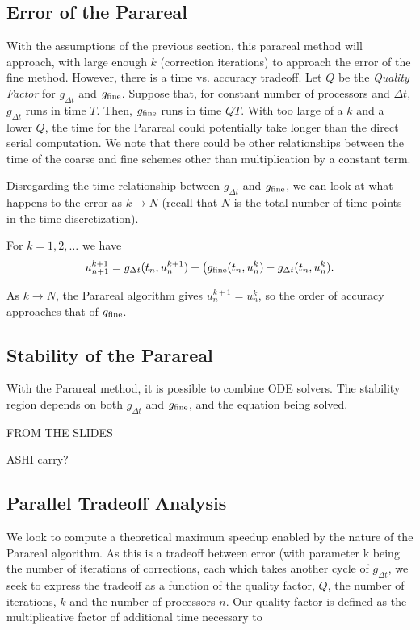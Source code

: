 \documentclass[letterpaper,12pt]{article}
\begin{document}
\subsection{Error of the Parareal}

With the assumptions of the previous section, this parareal method will
approach, with large enough $k$ (correction iterations) to approach the error of
the fine method. However, there is a time vs. accuracy tradeoff. Let $Q$ be the
\emph{Quality Factor} for $g_{\Delta t}$ and $g_{\textnormal{fine}}$. Suppose
that, for constant number of processors and $\Delta t$, $g_{\Delta t}$ runs in
time $T$. Then, $g_{\textnormal{fine}}$ runs in time $QT$. With too large of a
$k$ and a lower $Q$, the time for the Parareal could potentially take longer
than the direct serial computation. We note that there could be other
relationships between the time of the coarse and fine schemes other than
multiplication by a constant term. 

Disregarding the time relationship between $g_{\Delta t}$ and
$g_{\textnormal{fine}}$, we can look at what happens to the error as $k \to N$
(recall that $N$ is the total number of time points in the time discretization). 

For $k = 1, 2, \ldots$ we have 
\[u_{n+1}^{k+1} = g_{\Delta t} (t_n, u_n^{k+1}) + \big(
g_{\textnormal{fine}}(t_n, u_n^k) - g_{\Delta t}(t_n, u_n^k). \]

As $k \to N$, the Parareal algorithm gives $u_{n}^{k+1} = u^k_n$, so the order
of accuracy approaches that of $g_{\textnormal{fine}}$. 


\subsection{Stability of the Parareal}

With the Parareal method, it is possible to combine ODE solvers. The stability region depends on both $g_{\Delta t}$ and $g_{\textnormal{fine}}$, and the
equation being solved. 

FROM THE SLIDES 

ASHI carry?


\subsection{Parallel Tradeoff Analysis}

We look to compute a theoretical maximum speedup enabled by the nature of the Parareal algorithm.  As this is a tradeoff between error (with parameter k being the number of iterations of corrections, each which takes another cycle of $g_{\Delta t}$, we seek to express the tradeoff as a function of the quality factor, $Q$, the number of iterations, $k$ and the number of processors $n$.  Our quality factor is defined as the multiplicative factor of additional time necessary to 
\end{document}
